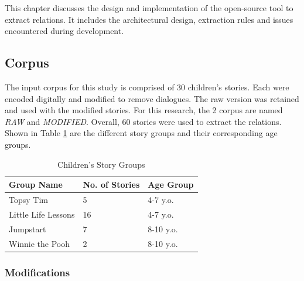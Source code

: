 %
%
%                 

\label{sec:designimplementation}

This chapter discusses the design and implementation of the open-source tool to extract relations. It includes the architectural design, extraction rules and issues encountered during development.

\subsection{Corpus}
\label{sec:corpus}

The input corpus for this study is comprised of 30 children's stories. Each were encoded digitally and modified to remove dialogues. The raw version was retained and used with the modified stories. For this research, the 2 corpus are named \emph{RAW} and \emph{MODIFIED}. Overall, 60 stories were used to extract the relations. Shown in Table \ref{tab:stories} are the different story groups and their corresponding age groups. 

\begin{table}[ht]   %
\centering
\caption{Children's Story Groups} \vspace{0.25em}
\begin{tabular}{|p{4cm}|p{2cm}|p{3cm}|} \hline
Group Name & No. of Stories & Age Group \\ \hline
Topsy Tim					& 5 & 4-7 y.o. \\ \hline
Little Life Lessons			& 16 & 4-7 y.o. \\ \hline
Jumpstart					& 7 & 8-10 y.o. \\ \hline
Winnie the Pooh				& 2 & 8-10 y.o. \\ \hline
\end{tabular}
\label{tab:stories}
\end{table}

\subsubsection{Modifications}
\label{sec:modifications}

